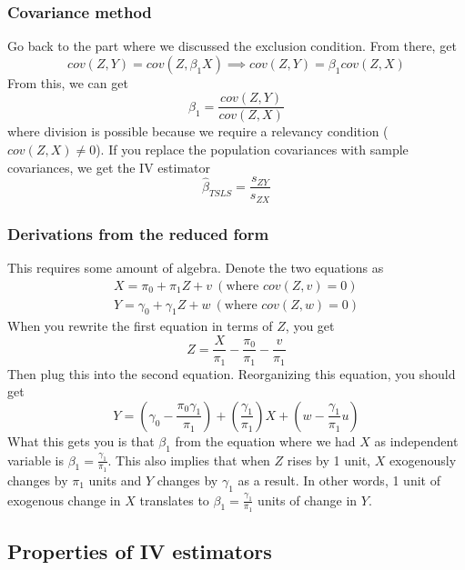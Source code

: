 \documentclass[12pt]{article}
\theoremstyle{definition}
\theoremstyle{property}
\theoremstyle{assumption}
\theoremstyle{example}
\theoremstyle{comment}
\begin{document}
\subsubsection{Covariance method}
Go back to the part where we discussed the exclusion condition. From there, get
\[
cov(Z,Y)=cov(Z,\beta_1X) \implies cov(Z,Y)=\beta_1cov(Z,X)
\]
From this, we can get
\[
\beta_1=\frac{cov(Z,Y)}{cov(Z,X)}
\]
where division is possible because we require a relevancy condition ($cov(Z,X)\neq0$). If you replace the population covariances with sample covariances, we get the IV estimator
\[
\hat{\beta}_{TSLS}=\frac{s_{ZY}}{s_{ZX}}
\]
\subsubsection{Derivations from the reduced form}
This requires some amount of algebra. Denote the two equations as
\begin{gather*}
X=\pi_0+\pi_1Z+v \ (\text{where }cov(Z,v)=0)\\ Y=\gamma_0+\gamma_1Z+w \ (\text{where }cov(Z,w)=0)
\end{gather*}
When you rewrite the first equation in terms of $Z$, you get
\[
Z=\frac{X}{\pi_1}-\frac{\pi_0}{\pi_1}-\frac{v}{\pi_1}
\]
Then plug this into the second equation. Reorganizing this equation, you should get
\[
Y=\left(\gamma_0-\frac{\pi_0\gamma_1}{\pi_1}\right)+\left(\frac{\gamma_1}{\pi_1}\right)X+\left(w-\frac{\gamma_1}{\pi_1}u\right)
\]
What this gets you is that $\beta_1$ from the equation where we had $X$ as independent variable is $\beta_1 = \frac{\gamma_1}{\pi_1}$. This also implies that when $Z$ rises by 1 unit, $X$ exogenously changes by $\pi_1$ units and $Y$ changes by $\gamma_1$ as a result. In other words, 1 unit of exogenous change in $X$ translates to  $\beta_1 = \frac{\gamma_1}{\pi_1}$ units of change in $Y$. \par\medskip



\subsection{Properties of IV estimators}
\end{document}
